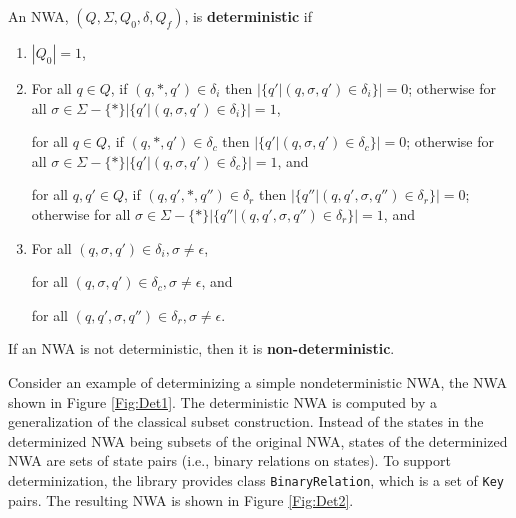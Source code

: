 \documentclass{llncs}
\begin{document}
\begin{definition}
An NWA, $(Q,\Sigma,Q_0,\delta,Q_f)$, is \textbf{deterministic} if 

\begin{enumerate} 

\item $|Q_0| = 1$, 

\item 
 For all $q \in Q$, if $(q,*,q') \in \delta_i$ then $|\{q'|(q,\sigma,q') \in \delta_i\}| = 0$; otherwise for all $\sigma \in \Sigma - \{*\} |\{q'|(q,\sigma,q') \in \delta_i\}| = 1$,

 for all $q \in Q$, if $(q,*,q') \in \delta_c$ then $ |\{q'|(q,\sigma,q') \in \delta_c\}| = 0$; otherwise for all $\sigma \in \Sigma - \{*\} |\{q'|(q,\sigma,q') \in \delta_c\}| = 1$,  and

 for all $q,q' \in Q$, if $(q,q',*,q'') \in \delta_r$ then $|\{q''|(q,q',\sigma,q'') \in \delta_r\}| = 0$; otherwise for all $\sigma \in \Sigma - \{*\} |\{q''|(q,q',\sigma,q'') \in \delta_r\}| = 1$, and

\item For all $(q,\sigma,q') \in \delta_i, \sigma \neq \epsilon$,

 for all $(q,\sigma,q') \in \delta_c, \sigma \neq \epsilon$,  and 

 for all $(q,q',\sigma,q'') \in \delta_r, \sigma \neq \epsilon$.\\

\end{enumerate}

If an NWA is not deterministic, then it is \textbf{non-deterministic}.
\end{definition}

Consider an example of determinizing a simple nondeterministic NWA, the NWA shown in Figure \ref{Fig:Det1}.  The deterministic NWA is computed by a generalization of the classical subset construction.  Instead of the states in the determinized NWA being subsets of the original NWA, states of  the determinized NWA are sets of state pairs (i.e., binary relations on states).  To support determinization, the library provides class \texttt{BinaryRelation}, which is a set of \texttt{Key} pairs. \cite{DLT:AM2006}  The resulting NWA is shown in Figure \ref{Fig:Det2}.
\end{document}
